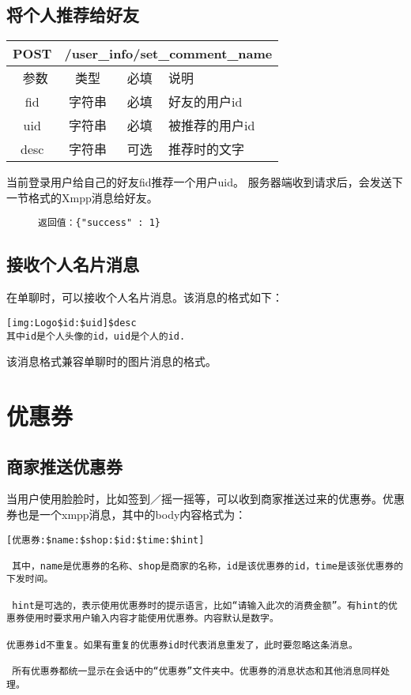 \subsection{ 将个人推荐给好友}
\begin{table}[H]
   \begin{center}
\begin{tabular}{|c|c|c|p{12cm}|}
\hline
POST & \multicolumn{3}{|c|}{/user\_info/set\_comment\_name} \\
\hline\hline
 \  参数  & 类型 & 必填 &  说明  \\
\hline
 fid  & 字符串 & 必填 &  好友的用户id\\
 \hline
 uid  & 字符串 & 必填 &  被推荐的用户id\\
\hline
 desc  & 字符串 & 可选 &  推荐时的文字\\
\hline
\end{tabular}
   \end{center}
\end{table}
当前登录用户给自己的好友fid推荐一个用户uid。
服务器端收到请求后，会发送下一节格式的Xmpp消息给好友。

\begin{figure}[H]
\begin{verbatim}
返回值：{"success" : 1}
\end{verbatim}
\end{figure}


\subsection{接收个人名片消息}
在单聊时，可以接收个人名片消息。该消息的格式如下：
\begin{verbatim}
[img:Logo$id:$uid]$desc
其中id是个人头像的id，uid是个人的id.
\end{verbatim}
该消息格式兼容单聊时的图片消息的格式。


\section{优惠券}

\subsection{商家推送优惠券}
当用户使用脸脸时，比如签到／摇一摇等，可以收到商家推送过来的优惠券。优惠券也是一个xmpp消息，其中的body内容格式为：

\begin{verbatim}
[优惠券:$name:$shop:$id:$time:$hint]

 其中，name是优惠券的名称、shop是商家的名称，id是该优惠券的id，time是该张优惠券的下发时间。
 
 hint是可选的，表示使用优惠券时的提示语言，比如“请输入此次的消费金额”。有hint的优惠券使用时要求用户输入内容才能使用优惠券。内容默认是数字。
 
优惠券id不重复。如果有重复的优惠券id时代表消息重发了，此时要忽略这条消息。
 
 所有优惠券都统一显示在会话中的“优惠券”文件夹中。优惠券的消息状态和其他消息同样处理。
\end{verbatim}

